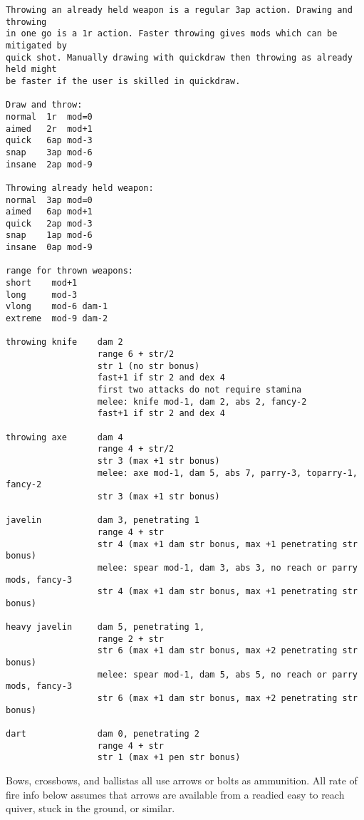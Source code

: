 \small \begin{verbatim}
Throwing an already held weapon is a regular 3ap action. Drawing and throwing 
in one go is a 1r action. Faster throwing gives mods which can be mitigated by 
quick shot. Manually drawing with quickdraw then throwing as already held might 
be faster if the user is skilled in quickdraw.

Draw and throw:
normal  1r  mod=0
aimed   2r  mod+1
quick   6ap mod-3
snap    3ap mod-6
insane  2ap mod-9

Throwing already held weapon:
normal  3ap mod=0
aimed   6ap mod+1
quick   2ap mod-3
snap    1ap mod-6
insane  0ap mod-9

range for thrown weapons:
short    mod+1
long     mod-3
vlong    mod-6 dam-1
extreme  mod-9 dam-2

throwing knife    dam 2
                  range 6 + str/2
                  str 1 (no str bonus)
                  fast+1 if str 2 and dex 4
                  first two attacks do not require stamina
                  melee: knife mod-1, dam 2, abs 2, fancy-2
                  fast+1 if str 2 and dex 4

throwing axe      dam 4
                  range 4 + str/2
                  str 3 (max +1 str bonus)
                  melee: axe mod-1, dam 5, abs 7, parry-3, toparry-1, fancy-2
                  str 3 (max +1 str bonus)

javelin           dam 3, penetrating 1
                  range 4 + str
                  str 4 (max +1 dam str bonus, max +1 penetrating str bonus)
                  melee: spear mod-1, dam 3, abs 3, no reach or parry mods, fancy-3
                  str 4 (max +1 dam str bonus, max +1 penetrating str bonus)

heavy javelin     dam 5, penetrating 1,
                  range 2 + str
                  str 6 (max +1 dam str bonus, max +2 penetrating str bonus)
                  melee: spear mod-1, dam 5, abs 5, no reach or parry mods, fancy-3
                  str 6 (max +1 dam str bonus, max +2 penetrating str bonus)

dart              dam 0, penetrating 2
                  range 4 + str
                  str 1 (max +1 pen str bonus)

\end{verbatim} \pagebreak[3] \normalsize


Bows, crossbows, and ballistas all use arrows or bolts as ammunition. All rate of fire info below assumes that arrows are available from a readied easy to reach quiver, stuck in the ground, or similar.

